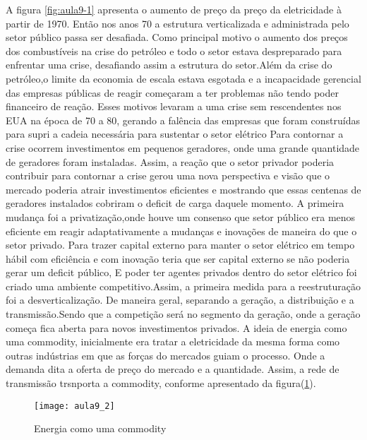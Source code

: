   A figura \ref{fig:aula9-1} apresenta o aumento de preço da preço da eletricidade à partir de 1970. Então nos anos 70 a estrutura verticalizada e administrada pelo setor público passa ser desafiada. Como principal motivo o aumento dos preços dos combustíveis na crise do petróleo e todo o setor estava despreparado para enfrentar uma crise, desafiando assim a estrutura do setor.Além da crise do petróleo,o limite da economia de escala estava esgotada e a incapacidade gerencial das empresas públicas de reagir começaram a ter problemas não tendo poder financeiro de reação. Esses motivos levaram a uma crise sem rescendentes nos EUA na época de 70 a 80, gerando a falência das empresas que foram construídas para supri a cadeia necessária para sustentar o setor elétrico
  Para contornar a crise ocorrem investimentos em pequenos geradores, onde uma grande quantidade de geradores foram instaladas. Assim, a reação que o setor privador poderia contribuir para contornar a crise gerou uma nova perspectiva e visão que o mercado poderia atrair investimentos eficientes e mostrando que essas centenas de geradores instalados cobriram o deficit de carga daquele momento.
  A primeira mudança foi a privatização,onde  houve um consenso que setor público era menos eficiente em reagir adaptativamente a mudanças e inovações de maneira do que o setor privado. Para trazer capital externo para manter o setor elétrico em tempo hábil com eficiência e com inovação teria que ser capital externo se não poderia gerar um deficit público, E poder ter agentes privados dentro do setor elétrico foi criado uma ambiente competitivo.Assim, a primeira medida para a reestruturação foi a desverticalização.
  De maneira geral, separando a geração, a distribuição e a transmissão.Sendo que a competição será no segmento da geração, onde a geração começa fica aberta para novos investimentos privados.
   A ideia de energia como uma commodity, inicialmente era tratar a eletricidade da mesma forma como outras indústrias em que as forças do mercados guiam o processo. Onde a demanda dita a oferta de preço do mercado e a quantidade. Assim, a rede de transmissão trsnporta a commodity, conforme apresentado da figura(\ref{fig:aula9-2}).
\begin{figure}[H]
\begin{centering}
\texttt{[image: aula9\_2]}\protect\caption{\label{fig:aula9-2} Energia como uma commodity }
\end{centering}
\end{figure}
